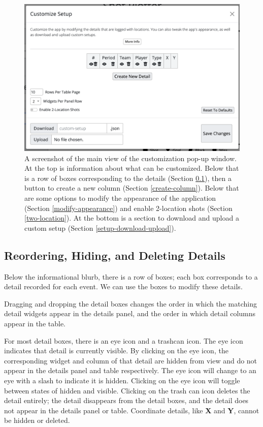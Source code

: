 \documentclass[letterpaper]{article}
\begin{document}
\begin{figure}[h!]
	\centering
	\includegraphics[width=1\linewidth]{images/main-page}
	\caption{A screenshot of the main view of the customization pop-up window. At the top is information about what can be customized. Below that is a row of boxes corresponding to the details (Section \ref{reorder-hide-delete}), then a button to create a new column (Section \ref{create-column}). Below that are some options to modify the appearance of the application (Section \ref{modify-appearance}) and enable 2-location shots (Section \ref{two-location}). At the bottom is a section to download and upload a custom setup (Section \ref{setup-download-upload}).}
		\label{fig:main-page}
	\end{figure}

\subsection{Reordering, Hiding, and Deleting Details}\label{reorder-hide-delete}
Below the informational blurb, there is a row of boxes; each box corresponds to a detail recorded for each event. We can use the boxes to modify these details.

Dragging and dropping the detail boxes changes the order in which the matching detail widgets appear in the details panel, and the order in which detail columns appear in the table.

For most detail boxes, there is an eye icon and a trashcan icon. The eye icon indicates that detail is currently visible. By clicking on the eye icon, the corresponding widget and column of that detail are hidden from view and do not appear in the details panel and table respectively.  The eye icon will change to an eye with a slash to indicate it is hidden. Clicking on the eye icon will toggle between states of hidden and visible. Clicking on the trash can icon deletes the detail entirely; the detail disappears from the detail boxes, and the detail does not appear in the details panel or table. Coordinate details, like \textbf{X} and \textbf{Y}, cannot be hidden or deleted.
\end{document}
